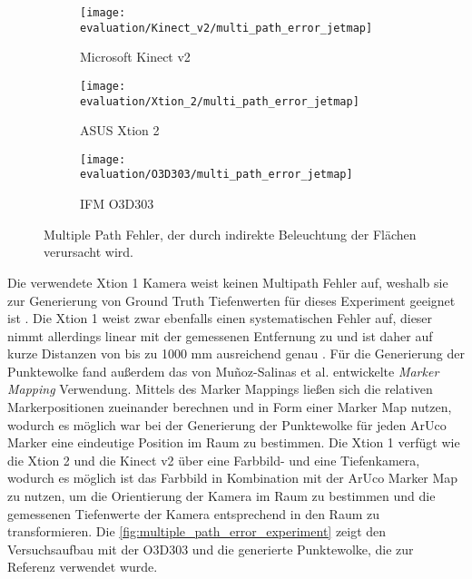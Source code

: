 \documentclass[thesis.tex]{subfiles}
\begin{document}
\begin{figure}[h!]
\centering
\begin{subfigure}[b]{0.98\textwidth}
    \centering
\end{subfigure}
\vspace{5mm}
\begin{subfigure}[b]{0.32\textwidth}
    \texttt{[image: evaluation/Kinect\_v2/multi\_path\_error\_jetmap]}
    \caption{Microsoft Kinect v2}
\end{subfigure}
\begin{subfigure}[b]{0.32\textwidth}
    \texttt{[image: evaluation/Xtion\_2/multi\_path\_error\_jetmap]}
    \caption{ASUS Xtion 2}
\end{subfigure}
\begin{subfigure}[b]{0.32\textwidth}
    \texttt{[image: evaluation/O3D303/multi\_path\_error\_jetmap]}
    \caption{IFM O3D303}
\end{subfigure}
\caption{Multiple Path Fehler, der durch indirekte Beleuchtung der Flächen verursacht wird.}
\label{fig:multiple_path_error_evaluation}
\end{figure}

Die verwendete Xtion 1 Kamera weist keinen Multipath Fehler auf, weshalb sie zur Generierung von Ground Truth Tiefenwerten für dieses Experiment geeignet ist \cite{bib:Wasenmueller2017}. Die Xtion 1 weist zwar ebenfalls einen systematischen Fehler auf, dieser nimmt allerdings linear mit der gemessenen Entfernung zu und ist daher auf kurze Distanzen von bis zu 1000 mm ausreichend genau \cite{bib:Giancola2018}\cite{bib:Teichman2013}. Für die Generierung der Punktewolke fand außerdem das von Muñoz-Salinas et al. \cite{bib:Munoz-Salinas2017} entwickelte \emph{Marker Mapping} Verwendung. Mittels des Marker Mappings ließen sich die relativen Markerpositionen zueinander berechnen und in Form einer Marker Map nutzen, wodurch es möglich war bei der Generierung der Punktewolke für jeden ArUco Marker eine eindeutige Position im Raum zu bestimmen. Die Xtion 1 verfügt wie die Xtion 2 und die Kinect v2 über eine Farbbild- und eine Tiefenkamera, wodurch es möglich ist das Farbbild in Kombination mit der ArUco Marker Map zu nutzen, um die Orientierung der Kamera im Raum zu bestimmen und die gemessenen Tiefenwerte der Kamera entsprechend in den Raum zu transformieren. Die \autoref{fig:multiple_path_error_experiment} zeigt den Versuchsaufbau mit der O3D303 und die generierte Punktewolke, die zur Referenz verwendet wurde.
\end{document}
